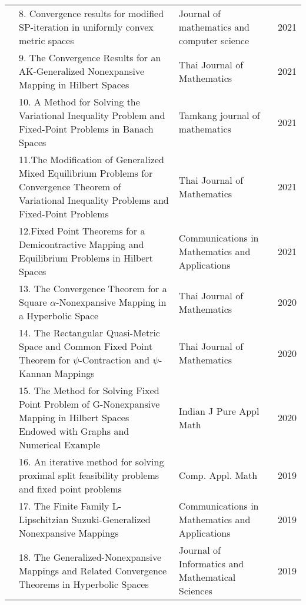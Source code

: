 {\begin{center}
\begin{longtable}{|p{}|p{}|p{}|p{}|}
	
&8. Convergence results
for modified SP-iteration
in uniformly convex metric spaces
&Journal of 
mathematics 
and computer 
science
&2021 \\ \cline{2-4}
	
&9. The Convergence Results for an 
AK-Generalized Nonexpansive
Mapping in Hilbert Spaces
&Thai Journal
of Mathematics
&2021 \\ \cline{2-4}

&10. A Method for Solving
the Variational Inequality 
Problem and Fixed-Point 
Problems in Banach Spaces
&Tamkang journal
of mathematics&
2021\\\cline{2-4}
	
&11.The Modification of 
Generalized Mixed 
Equilibrium Problems
for Convergence 
Theorem of Variational
Inequality Problems 
and Fixed-Point 
Problems
&Thai Journal 
of Mathematics
&2021\\ \cline{2-4}	

&12.Fixed Point Theorems 
for a Demicontractive
Mapping and Equilibrium 
Problems in Hilbert Spaces 
&Communications 
in Mathematics
and Applications
&2021 \\ \cline{2-4}

&13. The Convergence
Theorem for a Square 
$\alpha$-Nonexpansive
Mapping in a Hyperbolic Space
&Thai Journal of Mathematics
&2020 \\ \cline{2-4}

&14. The Rectangular
Quasi-Metric Space 
and Common
Fixed Point Theorem
for $\psi$-Contraction
and $\psi$-Kannan
Mappings
&Thai Journal 
of Mathematics
&2020 \\ \cline{2-4}

&15. The Method for 
Solving Fixed Point
Problem of G-Nonexpansive
Mapping in Hilbert 
Spaces Endowed 
with Graphs and 
Numerical Example
&Indian J Pure
Appl Math &
2020 \\ \cline{2-4}

&16. An iterative method for solving proximal split
feasibility problems and fixed point problems
&Comp. Appl. Math
&2019 \\ \cline{2-4}

&17. The Finite Family L-Lipschitzian 
Suzuki-Generalized Nonexpansive Mappings
&Communications in Mathematics and Applications
&2019 \\ \cline{2-4}

&18. The Generalized-Nonexpansive Mappings and 
Related Convergence Theorems in Hyperbolic Spaces 
&Journal of Informatics and Mathematical Sciences
&2019 \\ \hline



\end{longtable}
\end{center}}
